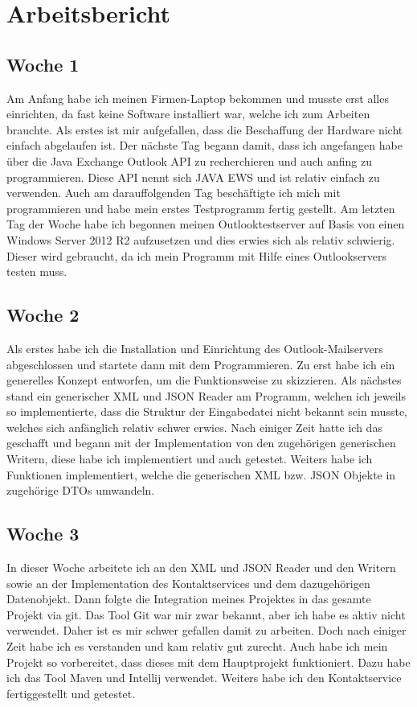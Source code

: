 \chapter{Arbeitsbericht}
\section{Woche 1} Am Anfang habe ich meinen Firmen-Laptop bekommen und musste erst alles einrichten, da fast keine Software installiert war, welche ich zum Arbeiten brauchte. Als erstes ist mir aufgefallen, dass die Beschaffung der Hardware nicht einfach abgelaufen ist.
Der nächste Tag begann damit, dass ich angefangen habe über die Java Exchange Outlook API zu recherchieren und auch anfing zu programmieren. Diese API nennt sich JAVA EWS und ist relativ einfach zu verwenden.
Auch am darauffolgenden Tag beschäftigte ich mich mit programmieren und habe mein erstes Testprogramm fertig gestellt.
Am letzten Tag der Woche habe ich begonnen meinen Outlooktestserver auf Basis von einen Windows Server 2012 R2 aufzusetzen und dies erwies sich als relativ schwierig. Dieser wird gebraucht, da ich mein Programm mit Hilfe eines Outlookservers testen muss.


\section{Woche 2}
Als erstes habe ich die Installation und Einrichtung des Outlook-Mailservers abgeschlossen und startete dann mit dem Programmieren. Zu erst habe ich ein generelles Konzept entworfen, um die Funktionsweise zu skizzieren.
Als nächstes stand ein generischer XML und JSON Reader am Programm, welchen ich jeweils so implementierte, dass die Struktur der Eingabedatei nicht bekannt sein musste, welches sich anfänglich relativ schwer erwies. Nach einiger Zeit hatte ich das geschafft und begann mit der Implementation von den zugehörigen generischen Writern, diese habe ich implementiert und auch getestet. Weiters habe ich Funktionen implementiert, welche die generischen XML bzw. JSON Objekte in zugehörige DTOs umwandeln.

\section{Woche 3}
In dieser Woche arbeitete ich an den XML und JSON Reader und den Writern sowie an der Implementation des Kontaktservices und dem dazugehörigen Datenobjekt. Dann folgte die Integration meines Projektes in das gesamte Projekt via git. Das Tool Git war mir zwar bekannt, aber ich habe es aktiv nicht verwendet. Daher ist es mir schwer gefallen damit zu arbeiten. Doch nach einiger Zeit habe ich es verstanden und kam relativ gut zurecht.  Auch habe ich mein Projekt so vorbereitet, dass dieses mit dem Hauptprojekt funktioniert. Dazu habe ich das Tool Maven und Intellij verwendet. Weiters habe ich den Kontaktservice fertiggestellt und getestet. 


